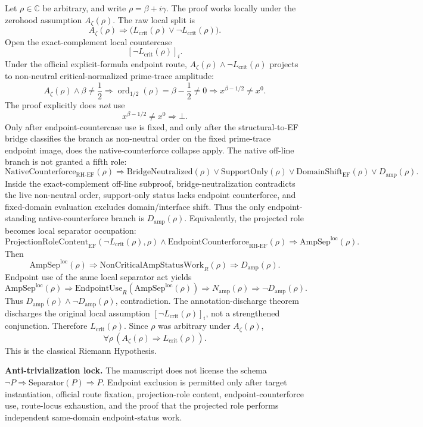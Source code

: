 \documentclass[11pt]{article}
\newcommand{\Az}{A_{\zeta}}
\newcommand{\Lcrit}{L_{\mathrm{crit}}}
\newcommand{\RH}{\mathrm{RH}}
\newcommand{\EF}{\mathrm{EF}}
\newcommand{\EndpointUse}{\mathrm{EndpointUse}}
\newcommand{\AmpSepLoc}{\mathrm{AmpSep}^{\mathrm{loc}}}
\newcommand{\NonCritAmpWork}{\mathrm{NonCriticalAmpStatusWork}}
\newcommand{\Damp}{D_{\mathrm{amp}}}
\newcommand{\Namp}{N_{\mathrm{amp}}}
\newcommand{\ProjRoleEF}{\mathrm{ProjectionRoleContent}_{\mathrm{EF}}}
\newcommand{\Counterforce}{\mathrm{EndpointCounterforce}}
\newcommand{\Support}{\mathrm{SupportOnly}}
\newcommand{\ordhalf}{\operatorname{ord}_{1/2}}
\newcommand{\NativeCounterforce}{\mathrm{NativeCounterforce}}
\newcommand{\BridgeNeutralized}{\mathrm{BridgeNeutralized}}
\newcommand{\DomainShiftEF}{\mathrm{DomainShift}_{\mathrm{EF}}}
\begin{document}
Let \(\rho\in\mathbb C\) be arbitrary, and write \(\rho=\beta+i\gamma\).  The proof works locally under the zerohood assumption \(\Az(\rho)\).  The raw local split is
\[
\Az(\rho)\Rightarrow \bigl(\Lcrit(\rho)\vee \neg\Lcrit(\rho)\bigr).
\]
Open the exact-complement local countercase
\[
[\neg\Lcrit(\rho)]_i.
\]
Under the official explicit-formula endpoint route, \(\Az(\rho)\wedge\neg\Lcrit(\rho)\) projects to non-neutral critical-normalized prime-trace amplitude:
\[
\Az(\rho)\wedge \beta\ne\frac12
\Rightarrow
\ordhalf(\rho)=\beta-\frac12\ne0
\Rightarrow
x^{\beta-1/2}\ne x^0.
\]
The proof explicitly does \emph{not} use
\[
x^{\beta-1/2}\ne x^0\Rightarrow \bot.
\]
Only after endpoint-countercase use is fixed, and only after the structural-to-EF bridge classifies the branch as non-neutral order on the fixed prime-trace endpoint image, does the native-counterforce collapse apply.  The native off-line branch is not granted a fifth role:
\[
\NativeCounterforce_{\RH\text{-}\EF}(\rho)
\Rightarrow
\BridgeNeutralized(\rho)\vee\Support(\rho)\vee\DomainShiftEF(\rho)\vee\Damp(\rho).
\]
Inside the exact-complement off-line subproof, bridge-neutralization contradicts the live non-neutral order, support-only status lacks endpoint counterforce, and fixed-domain evaluation excludes domain/interface shift.  Thus the only endpoint-standing native-counterforce branch is \(\Damp(\rho)\).  Equivalently, the projected role becomes local separator occupation:
\[
\ProjRoleEF(\neg\Lcrit(\rho),\rho)
\wedge \Counterforce_{\RH\text{-}\EF}(\rho)
\Rightarrow \AmpSepLoc(\rho).
\]
Then
\[
\AmpSepLoc(\rho)
\Rightarrow \NonCritAmpWork_R(\rho)
\Rightarrow \Damp(\rho).
\]
Endpoint use of the same local separator act yields
\[
\AmpSepLoc(\rho)
\Rightarrow \EndpointUse_R(\AmpSepLoc(\rho))
\Rightarrow \Namp(\rho)
\Rightarrow \neg\Damp(\rho).
\]
Thus \(\Damp(\rho)\wedge\neg\Damp(\rho)\), contradiction.  The annotation-discharge theorem discharges the original local assumption \([\neg\Lcrit(\rho)]_i\), not a strengthened conjunction.  Therefore \(\Lcrit(\rho)\).  Since \(\rho\) was arbitrary under \(\Az(\rho)\),
\[
\forall \rho\,(\Az(\rho)\Rightarrow \Lcrit(\rho)).
\]
This is the classical Riemann Hypothesis.

\textbf{Anti-trivialization lock.} The manuscript does not license the schema \(\neg P\Rightarrow \mathrm{Separator}(P)\Rightarrow P\).  Endpoint exclusion is permitted only after target instantiation, official route fixation, projection-role content, endpoint-counterforce use, route-locus exhaustion, and the proof that the projected role performs independent same-domain endpoint-status work.
\end{document}
